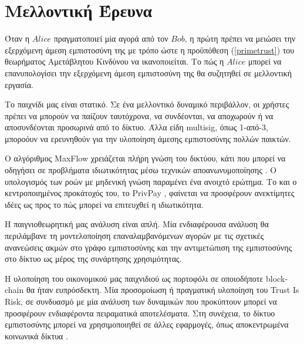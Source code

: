 \section{Μελλοντική Έρευνα}

    Όταν η $Alice$ πραγματοποιεί μία αγορά από τον $Bob$, η πρώτη πρέπει να μειώσει την εξερχόμενη άμεση εμπιστοσύνη της με
    τρόπο ώστε η προϋπόθεση (\ref{primetrust}) του θεωρήματος Αμετάβλητου Κινδύνου να ικανοποιείται. Το πώς η $Alice$ μπορεί
    να επανυπολογίσει την εξερχόμενη άμεση εμπιστοσύνη της θα συζητηθεί σε μελλοντική εργασία.

    Το παιχνίδι μας είναι στατικό. Σε ένα μελλοντικό δυναμικό περιβάλλον, οι χρήστες πρέπει να μπορούν να παίζουν ταυτόχρονα,
    να συνδέονται, να αποχωρούν ή να αποσυνδέονται προσωρινά από το δίκτυο. Άλλα είδη \textlatin{multisig}, όπως 1-από-3,
    μποροόυν να ερευνηθούν για την υλοποίηση άμεσης εμπιστοσύνης πολλών παικτών.

    Ο αλγόριθμος \textlatin{MaxFlow} χρειάζεται πλήρη γνώση του δικτύου, κάτι που μπορεί να οδηγήσει σε προβλήματα
    ιδιωτικότητας μέσω τεχνικών αποανωνυμοποίησης \cite{deanonymisation}. Ο υπολογισμός των ροών με μηδενική γνώση παραμένει
    ένα ανοιχτό ερώτημα. Το \cite{silentwhispers} και ο κεντροποιημένος προκάτοχός του, το \textlatin{PrivPay} \cite{privpay},
    φαίνεται να προσφέρουν ανεκτίμητες ιδέες ως προς το πώς μπορεί να επιτευχθεί η ιδιωτικότητα.

    Η παιγνιοθεωρητική μας ανάλυση είναι απλή. Μία ενδιαφέρουσα ανάλυση θα περιλάμβανε τη μοντελοποίηση επαναλαμβανόμενων
    αγορών με τις σχετικές ανανεώσεις ακμών στο γράφο εμπιστοσύνης και την αντιμετώπιση της εμπιστοσύνης στο δίκτυο ως μέρος
    της συνάρτησης χρησιμότητας.

    Η υλοποίηση του οικονομικού μας παιχνιδιού ως πορτοφόλι σε οποιοδήποτε \textlatin{blockchain} θα ήταν ευπρόσδεκτη. Μία
    προσομοίωση ή πραγματική υλοποίηση του \textlatin{Trust Is Risk}, σε συνδυασμό με μία ανάλυση των δυναμικών που προκύπτουν
    μπορεί να προσφέρουν ενδιαφέροντα πειραματικά αποτελέσματα. Στη συνέχεια, το δίκτυο εμπιστοσύνης μπορεί να χρησιμοποιηθεί
    σε άλλες εφαρμογές, όπως αποκεντρωμένα κοινωνικά δίκτυα \cite{synereo}.
